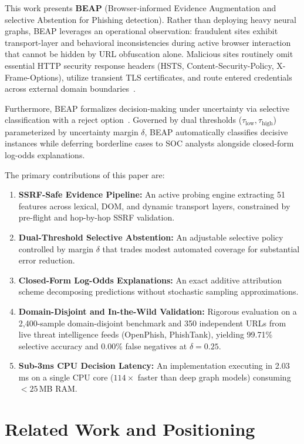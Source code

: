 \documentclass{llncs}
\begin{document}
This work presents \textbf{BEAP} (Browser-informed Evidence Augmentation and selective Abstention for Phishing detection). Rather than deploying heavy neural graphs, BEAP leverages an operational observation: fraudulent sites exhibit transport-layer and behavioral inconsistencies during active browser interaction that cannot be hidden by URL obfuscation alone. Malicious sites routinely omit essential HTTP security response headers (HSTS, Content-Security-Policy, X-Frame-Options), utilize transient TLS certificates, and route entered credentials across external domain boundaries~\cite{sanchez2022,shukla2024}.

Furthermore, BEAP formalizes decision-making under uncertainty via selective classification with a reject option~\cite{hendrickx2024}. Governed by dual thresholds ($\tau_{\text{low}}, \tau_{\text{high}}$) parameterized by uncertainty margin $\delta$, BEAP automatically classifies decisive instances while deferring borderline cases to SOC analysts alongside closed-form log-odds explanations.

The primary contributions of this paper are:
\begin{enumerate}[leftmargin=1.8em]
    \item \textbf{SSRF-Safe Evidence Pipeline:} An active probing engine extracting 51 features across lexical, DOM, and dynamic transport layers, constrained by pre-flight and hop-by-hop SSRF validation.
    \item \textbf{Dual-Threshold Selective Abstention:} An adjustable selective policy controlled by margin $\delta$ that trades modest automated coverage for substantial error reduction.
    \item \textbf{Closed-Form Log-Odds Explanations:} An exact additive attribution scheme decomposing predictions without stochastic sampling approximations.
    \item \textbf{Domain-Disjoint and In-the-Wild Validation:} Rigorous evaluation on a 2,400-sample domain-disjoint benchmark and 350 independent URLs from live threat intelligence feeds (OpenPhish, PhishTank), yielding 99.71\% selective accuracy and 0.00\% false negatives at $\delta=0.25$.
    \item \textbf{Sub-3ms CPU Decision Latency:} An implementation executing in 2.03\,ms on a single CPU core ($114\times$ faster than deep graph models) consuming $<25$\,MB RAM.
\end{enumerate}

\section{Related Work and Positioning}
\end{document}
